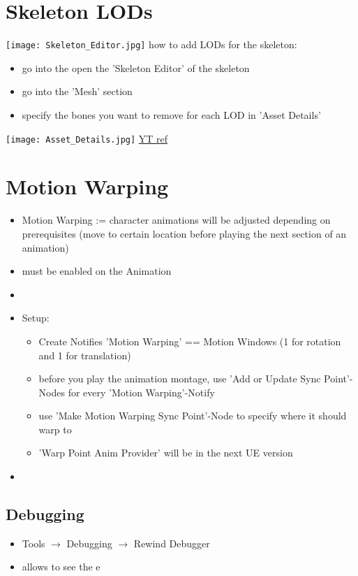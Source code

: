     \section{Skeleton LODs}
         \texttt{[image: Skeleton\_Editor.jpg]}
        how to add LODs for the skeleton:
        \begin{itemize}
            \item go into the open the 'Skeleton Editor' of the skeleton
            \item go into the 'Mesh' section
            \item specify the bones you want to remove for each LOD in 'Asset Details'
        \end{itemize}
        \texttt{[image: Asset\_Details.jpg]}
        \href{https://www.youtube.com/watch?v=ti8NopRIgFs}{YT ref}



    \section{Motion Warping}
            \begin{itemize}
            \item Motion Warping := character animations will be adjusted depending on prerequisites (move to certain location before playing the next section of an animation)
            \item {} must be enabled on the Animation
            \item 
            \item Setup:
            \begin{itemize}
                \item Create Notifies 'Motion Warping' == Motion Windows (1 for rotation and 1 for translation)
                \item before you play the animation montage, use 'Add or Update Sync Point'-Nodes for every 'Motion Warping'-Notify
                \item use 'Make Motion Warping Sync Point'-Node to specify where it should warp to
                \item 'Warp Point Anim Provider' will be in the next UE version
            \end{itemize}
            \item 
        \end{itemize}

        \subsection{Debugging}
            \begin{itemize}
                \item Tools $\rightarrow$ Debugging $\rightarrow$ Rewind Debugger
                \item allows to see the e
            \end{itemize}


